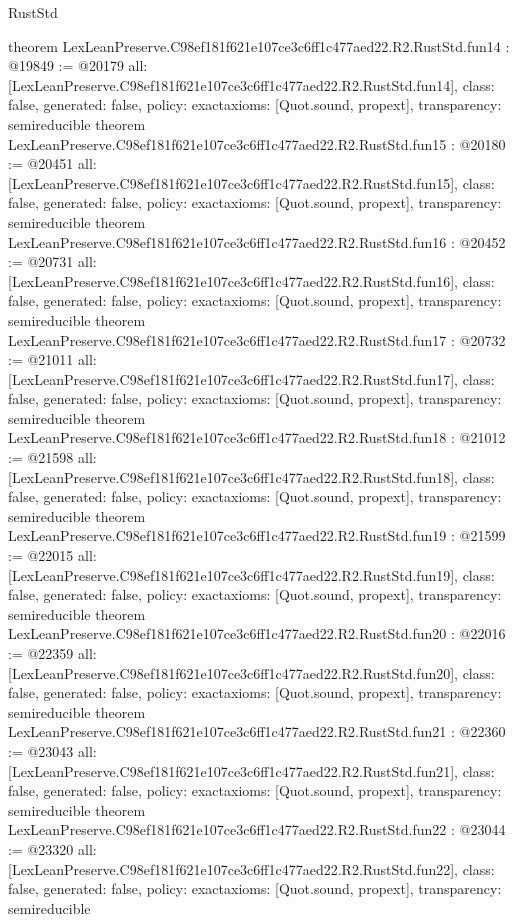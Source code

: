 \begin{lexlean}{RustStd}
\begin{coremodule}
{}
theorem LexLeanPreserve.C98ef181f621e107ce3c6ff1c477aed22.R2.RustStd.fun14 : @19849 := @20179 {
  all: [LexLeanPreserve.C98ef181f621e107ce3c6ff1c477aed22.R2.RustStd.fun14],
  class: false,
  generated: false,
  policy: exact{axioms: [Quot.sound, propext]},
  transparency: semireducible
}
theorem LexLeanPreserve.C98ef181f621e107ce3c6ff1c477aed22.R2.RustStd.fun15 : @20180 := @20451 {
  all: [LexLeanPreserve.C98ef181f621e107ce3c6ff1c477aed22.R2.RustStd.fun15],
  class: false,
  generated: false,
  policy: exact{axioms: [Quot.sound, propext]},
  transparency: semireducible
}
theorem LexLeanPreserve.C98ef181f621e107ce3c6ff1c477aed22.R2.RustStd.fun16 : @20452 := @20731 {
  all: [LexLeanPreserve.C98ef181f621e107ce3c6ff1c477aed22.R2.RustStd.fun16],
  class: false,
  generated: false,
  policy: exact{axioms: [Quot.sound, propext]},
  transparency: semireducible
}
theorem LexLeanPreserve.C98ef181f621e107ce3c6ff1c477aed22.R2.RustStd.fun17 : @20732 := @21011 {
  all: [LexLeanPreserve.C98ef181f621e107ce3c6ff1c477aed22.R2.RustStd.fun17],
  class: false,
  generated: false,
  policy: exact{axioms: [Quot.sound, propext]},
  transparency: semireducible
}
theorem LexLeanPreserve.C98ef181f621e107ce3c6ff1c477aed22.R2.RustStd.fun18 : @21012 := @21598 {
  all: [LexLeanPreserve.C98ef181f621e107ce3c6ff1c477aed22.R2.RustStd.fun18],
  class: false,
  generated: false,
  policy: exact{axioms: [Quot.sound, propext]},
  transparency: semireducible
}
theorem LexLeanPreserve.C98ef181f621e107ce3c6ff1c477aed22.R2.RustStd.fun19 : @21599 := @22015 {
  all: [LexLeanPreserve.C98ef181f621e107ce3c6ff1c477aed22.R2.RustStd.fun19],
  class: false,
  generated: false,
  policy: exact{axioms: [Quot.sound, propext]},
  transparency: semireducible
}
theorem LexLeanPreserve.C98ef181f621e107ce3c6ff1c477aed22.R2.RustStd.fun20 : @22016 := @22359 {
  all: [LexLeanPreserve.C98ef181f621e107ce3c6ff1c477aed22.R2.RustStd.fun20],
  class: false,
  generated: false,
  policy: exact{axioms: [Quot.sound, propext]},
  transparency: semireducible
}
theorem LexLeanPreserve.C98ef181f621e107ce3c6ff1c477aed22.R2.RustStd.fun21 : @22360 := @23043 {
  all: [LexLeanPreserve.C98ef181f621e107ce3c6ff1c477aed22.R2.RustStd.fun21],
  class: false,
  generated: false,
  policy: exact{axioms: [Quot.sound, propext]},
  transparency: semireducible
}
theorem LexLeanPreserve.C98ef181f621e107ce3c6ff1c477aed22.R2.RustStd.fun22 : @23044 := @23320 {
  all: [LexLeanPreserve.C98ef181f621e107ce3c6ff1c477aed22.R2.RustStd.fun22],
  class: false,
  generated: false,
  policy: exact{axioms: [Quot.sound, propext]},
  transparency: semireducible
}
\end{coremodule}
\end{lexlean}
